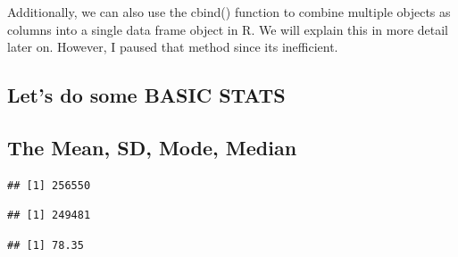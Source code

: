 \documentclass[
]{article}
\newenvironment{Shaded}{\begin{snugshade}}{\end{snugshade}}
\newcommand{\AttributeTok}[1]{\textcolor[rgb]{0.13,0.29,0.53}{#1}}
\newcommand{\FunctionTok}[1]{\textcolor[rgb]{0.13,0.29,0.53}{\textbf{#1}}}
\newcommand{\NormalTok}[1]{#1}
\newcommand{\SpecialCharTok}[1]{\textcolor[rgb]{0.81,0.36,0.00}{\textbf{#1}}}
\begin{document}
Additionally, we can also use the cbind() function to combine multiple
objects as columns into a single data frame object in R. We will explain
this in more detail later on. However, I paused that method since its
inefficient.

\hypertarget{lets-do-some-basic-stats}{%
\subsection{Let's do some BASIC STATS}\label{lets-do-some-basic-stats}}

\hypertarget{the-mean-sd-mode-median}{%
\subsection{The Mean, SD, Mode, Median}\label{the-mean-sd-mode-median}}

\begin{Shaded}
\end{Shaded}

\begin{verbatim}
## [1] 256550
\end{verbatim}

\begin{Shaded}
\end{Shaded}

\begin{verbatim}
## [1] 249481
\end{verbatim}

\begin{Shaded}
\end{Shaded}

\begin{verbatim}
## [1] 78.35
\end{verbatim}

\begin{Shaded}
\end{Shaded}
\end{document}
